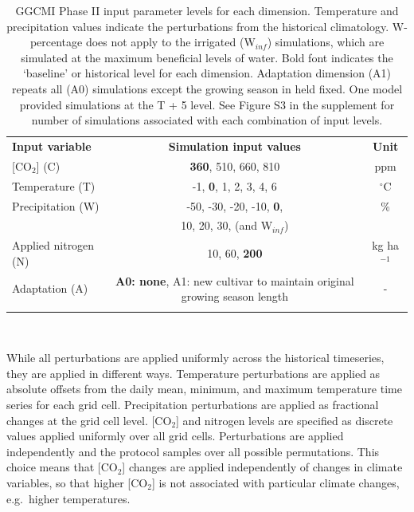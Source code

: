 \documentclass[gmd, manuscript]{copernicus} %
\begin{document}
\begin{table}[t]
\caption{GGCMI Phase II input parameter levels for each dimension. Temperature and precipitation values indicate the perturbations from the historical climatology. W-percentage does not apply to the irrigated (W$_{inf}$) simulations, which are simulated at the maximum beneficial levels of water. Bold font indicates the `baseline' or historical level for each dimension. Adaptation dimension (A1) repeats all (A0) simulations except the growing season in held fixed. One model provided simulations at the T + 5 level. See Figure S3 in the supplement for number of simulations associated with each combination of input levels.}
\label{table:inputs} 
    \begin{tabular}{lcc} 
        \tophline \vspace{1mm}
        \textbf{Input variable} & \textbf{Simulation input values} & \textbf{Unit} \\ \middlehline \vspace{1mm}
        [CO$_2$] (C) & \textbf{360}, 510, 660, 810 & ppm\\ \middlehline \vspace{1mm}
        Temperature (T) & -1, \textbf{0}, 1, 2, 3, 4, 6 & $^{\circ}$C\\ \middlehline \vspace{1mm}
        Precipitation (W) & -50, -30, -20, -10, \textbf{0}, & \% \\
        {} & 10, 20, 30, (and W$_{inf}$) & {} \\ \middlehline \vspace{1mm}
        Applied nitrogen (N) & 10, 60, \textbf{200} & kg ha$^{-1}$ \\ \middlehline \vspace{1mm}
        Adaptation (A) & \textbf{A0: none}, A1: new cultivar to maintain original growing season length & -\\ \bottomhline
    \end{tabular}\\
\end{table}

While all perturbations are applied uniformly across the historical timeseries, they are applied in different ways. Temperature perturbations are applied as absolute offsets from the daily mean, minimum, and maximum temperature time series for each grid cell.
Precipitation perturbations are applied as fractional changes at the grid cell level. [CO$_2$] and nitrogen levels are specified as discrete values applied uniformly over all grid cells. 
Perturbations are applied independently and the protocol samples over all possible permutations. This choice means that [CO$_2$] changes are applied independently of changes in climate variables, so that higher [CO$_2$] is not associated with particular climate changes, e.g.\ higher temperatures. 
\end{document}

